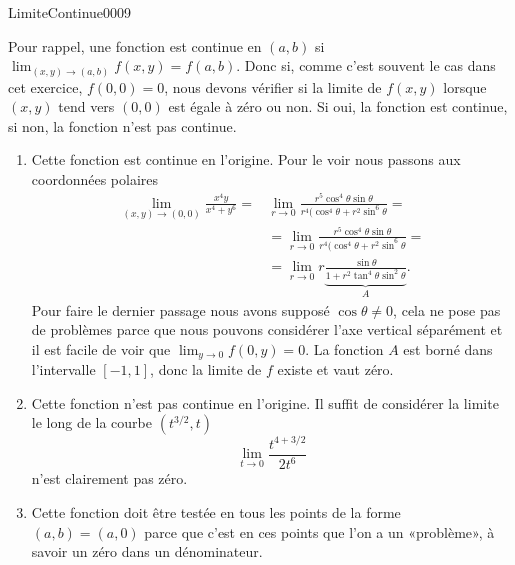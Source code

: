 \begin{corrige}{LimiteContinue0009}

	Pour rappel, une fonction est continue en $(a,b)$ si $\lim_{(x,y)\to(a,b)}f(x,y)=f(a,b)$. Donc si, comme c'est souvent le cas dans cet exercice,  $f(0,0)=0$, nous devons vérifier si la limite de $f(x,y)$ lorsque $(x,y)$ tend vers $(0,0)$ est égale à zéro ou non. Si oui, la fonction est continue, si non, la fonction n'est pas continue.

  \begin{enumerate}
  \item Cette fonction est continue en l'origine. Pour le voir nous passons aux coordonnées polaires
    \begin{equation}
      \begin{aligned}
        \lim_{(x,y)\to(0,0)} \frac{x^4y}{x^4+y^6}=&\lim_{r\to 0}\frac{r^5 \cos^4\theta\sin\theta}{r^4(\cos^4\theta+r^2\sin^6\theta}=\\
        &=\lim_{r\to 0}\frac{r^5 \cos^4\theta\sin\theta}{r^4(\cos^4\theta+r^2\sin^6\theta}=\\
        &=\lim_{r\to 0}r \underbrace{\frac{\sin\theta}{1 +r^2\tan^4\theta\sin^2\theta}}_{A}.
      \end{aligned}
     \end{equation}
      Pour faire le dernier passage nous avons supposé $\cos\theta\neq 0$, cela ne pose pas de problèmes parce que nous pouvons considérer l'axe vertical séparément et il est facile de voir que $\lim_{y\to 0}f(0,y)=0$.  La fonction $A$ est borné dans l'intervalle $[-1,1]$, donc la limite de $f$ existe et vaut zéro. 
      \item 

	      Cette fonction n'est pas continue en l'origine. Il suffit de considérer la limite le long de la courbe $(t^{3/2},t)$
        \begin{equation}
          \lim_{t\to 0} \frac{t^{4+3/2}}{2t^6}
        \end{equation}
        n'est clairement pas zéro.
        \item
		
	      Cette fonction doit être testée en tous les points de la forme $(a,b)=(a,0)$ parce que c'est en ces points que l'on a un «problème», à savoir un zéro dans un dénominateur. 
		

\end{enumerate}
\end{corrige}
